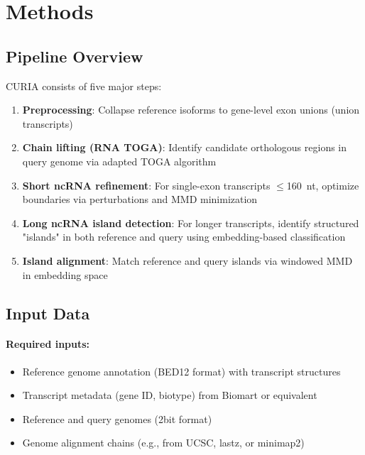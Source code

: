 \documentclass[11pt]{article}
\begin{document}
\section{Methods}

\subsection{Pipeline Overview}
CURIA consists of five major steps:
\begin{enumerate}
\item \textbf{Preprocessing}: Collapse reference isoforms to gene-level exon unions (union transcripts)
\item \textbf{Chain lifting (RNA TOGA)}: Identify candidate orthologous regions in query genome via adapted TOGA algorithm
\item \textbf{Short ncRNA refinement}: For single-exon transcripts $\leq$160~nt, optimize boundaries via perturbations and MMD minimization
\item \textbf{Long ncRNA island detection}: For longer transcripts, identify structured "islands" in both reference and query using embedding-based classification
\item \textbf{Island alignment}: Match reference and query islands via windowed MMD in embedding space
\end{enumerate}


\subsection{Input Data}
\paragraph{Required inputs:}
\begin{itemize}
\item Reference genome annotation (BED12 format) with transcript structures
\item Transcript metadata (gene ID, biotype) from Biomart or equivalent
\item Reference and query genomes (2bit format)
\item Genome alignment chains (e.g., from UCSC, lastz, or minimap2)
\end{itemize}
\end{document}
